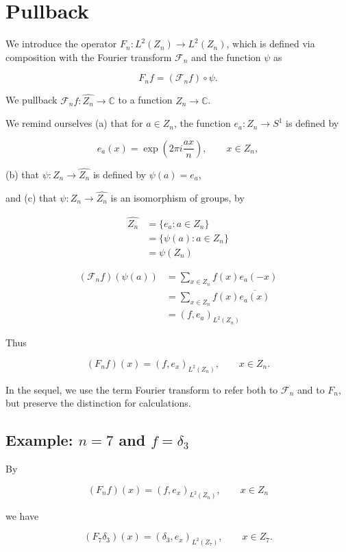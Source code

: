 \documentclass[11pt]{article} %
\begin{document}
\section{Pullback}

We introduce the operator $F_n: L^2(Z_n) \to L^2(Z_n)$, which is defined via composition with the Fourier transform $\mathscr{F}_n$ and the function $\psi$ as

$$
F_n f = (\mathscr{F}_nf) \circ \psi.
$$

We pullback  $\mathscr{F}_nf:\widehat{Z_n} \to \mathbb{C}$ to a function $Z_n \to \mathbb{C}$.

We remind ourselves (a) that for $a \in Z_n$, the function $e_a:Z_n \to S^1$ is defined by

$$
e_a(x) = \exp\left(2\pi i \dfrac{ax}{n}\right), \qquad x \in Z_n,
$$

(b) that $\psi:Z_n \to \widehat{Z_n}$ is defined by $\psi(a)=e_a$,

and (c) that $\psi:Z_n \to \widehat{Z_n}$ is an isomorphism of groups, by

\begin{align*}
\widehat{Z_n} &= \{e_a : a \in Z_n\}\\
&= \{\psi(a): a \in Z_n\}\\
&= \psi(Z_n)
\end{align*}


\begin{align*}
(\mathscr{F}_nf)(\psi(a))&=\sum_{x \in Z_n} f(x) e_a(-x)\\
&=\sum_{x \in Z_n} f(x) \overline{e_a(x)}\\
&=(f,e_a)_{L^2(Z_n)}
\end{align*}

Thus

$$
(F_n f)(x) = (f,e_x)_{L^2(Z_n)}, \qquad x \in Z_n.
$$

In the sequel, we use the term Fourier transform to refer both to $\mathscr{F}_n$ and to $F_n$, but preserve the distinction for calculations.


\subsection{Example: $n=7$ and $f=\delta_3$}

By

$$
(F_n f)(x) = (f,e_x)_{L^2(Z_n)}, \qquad x \in Z_n
$$

we have

$$
(F_7 \delta_3)(x) = (\delta_3,e_x)_{L^2(Z_7)}, \qquad x \in Z_7.
$$
\end{document}
